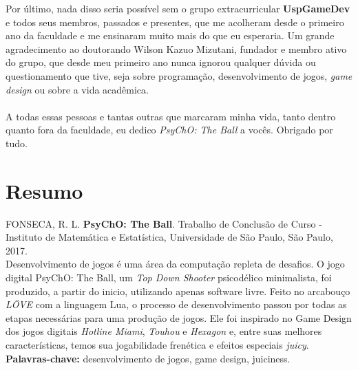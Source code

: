 Por último, nada disso seria possível sem o grupo extracurricular \textbf{UspGameDev} e todos seus membros, passados e presentes, que me acolheram desde o primeiro ano da faculdade e me ensinaram muito mais do que eu esperaria. Um grande agradecimento ao doutorando Wilson Kazuo Mizutani, fundador e membro ativo do grupo, que desde meu primeiro ano nunca ignorou qualquer dúvida ou questionamento que tive, seja sobre programação, desenvolvimento de jogos, \textit{game design} ou sobre a vida acadêmica.\\\\

A todas essas pessoas e tantas outras que marcaram minha vida, tanto dentro quanto fora da faculdade, eu dedico \textit{PsyChO: The Ball} a vocês. Obrigado por tudo.

\chapter*{Resumo}

\noindent%
FONSECA, R. L. \textbf{PsyChO: The Ball}. Trabalho de Conclusão de Curso
 - Instituto de Matemática e Estatística, Universidade de São Paulo,
São Paulo, 2017.
\\

Desenvolvimento de jogos é uma área da computação repleta de desafios. O jogo digital PsyChO: The Ball, um \textit{Top Down Shooter} psicodélico minimalista, foi produzido, a partir do inicio, utilizando apenas software livre. Feito no arcabouço \textit{LÖVE} com a linguagem Lua, o processo de desenvolvimento passou por todas as etapas necessárias para uma produção de jogos. Ele foi inspirado no Game Design dos jogos digitais \textit{Hotline Miami}, \textit{Touhou} e \textit{Hexagon} e, entre suas melhores características, temos sua jogabilidade frenética e efeitos especiais \textit{juicy}.
\\

\noindent%
\textbf{Palavras-chave:} desenvolvimento de jogos, game design, juiciness.
